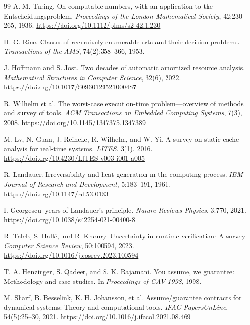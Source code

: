 \begin{thebibliography}{99}
A. M. Turing.
\newblock On computable numbers, with an application to the Entscheidungsproblem.
\newblock \emph{Proceedings of the London Mathematical Society}, 42:230--265, 1936.
\newblock \url{https://doi.org/10.1112/plms/s2-42.1.230}

H. G. Rice.
\newblock Classes of recursively enumerable sets and their decision problems.
\newblock \emph{Transactions of the AMS}, 74(2):358--366, 1953.

J. Hoffmann and S. Jost.
\newblock Two decades of automatic amortized resource analysis.
\newblock \emph{Mathematical Structures in Computer Science}, 32(6), 2022.
\newblock \url{https://doi.org/10.1017/S0960129521000487}

R. Wilhelm et al.
\newblock The worst-case execution-time problem---overview of methods and survey of tools.
\newblock \emph{ACM Transactions on Embedded Computing Systems}, 7(3), 2008.
\newblock \url{https://doi.org/10.1145/1347375.1347389}

M. Lv, N. Guan, J. Reineke, R. Wilhelm, and W. Yi.
\newblock A survey on static cache analysis for real-time systems.
\newblock \emph{LITES}, 3(1), 2016.
\newblock \url{https://doi.org/10.4230/LITES-v003-i001-a005}

R. Landauer.
\newblock Irreversibility and heat generation in the computing process.
\newblock \emph{IBM Journal of Research and Development}, 5:183--191, 1961.
\newblock \url{https://doi.org/10.1147/rd.53.0183}

I. Georgescu.
 years of Landauer's principle.
\newblock \emph{Nature Reviews Physics}, 3:770, 2021.
\newblock \url{https://doi.org/10.1038/s42254-021-00400-8}

R. Taleb, S. Hall\'e, and R. Khoury.
\newblock Uncertainty in runtime verification: A survey.
\newblock \emph{Computer Science Review}, 50:100594, 2023.
\newblock \url{https://doi.org/10.1016/j.cosrev.2023.100594}

T. A. Henzinger, S. Qadeer, and S. K. Rajamani.
\newblock You assume, we guarantee: Methodology and case studies.
\newblock In \emph{Proceedings of CAV 1998}, 1998.

M. Sharf, B. Besselink, K. H. Johansson, et al.
\newblock Assume/guarantee contracts for dynamical systems: Theory and computational
tools.
\newblock \emph{IFAC-PapersOnLine}, 54(5):25--30, 2021.
\newblock \url{https://doi.org/10.1016/j.ifacol.2021.08.469}


\end{thebibliography}
